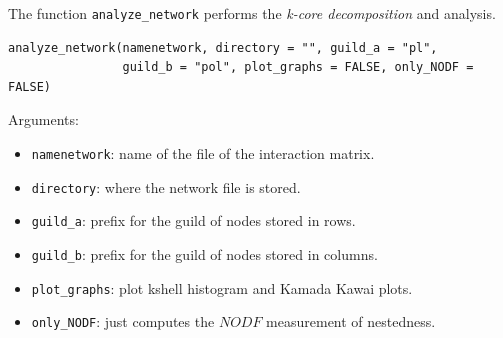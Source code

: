 \documentclass[12pt]{article}
\begin{document}
The function \texttt{analyze\_network} performs the \textit{k-core decomposition} and analysis.


\fontsize{3.5mm}{3.5mm}\selectfont
\begin{verbatim}
analyze_network(namenetwork, directory = "", guild_a = "pl",
                guild_b = "pol", plot_graphs = FALSE, only_NODF = FALSE)
\end{verbatim}
\normalsize

Arguments:
\small
\begin{itemize}

\item \texttt{namenetwork}:  name of the file of the interaction matrix.
	
\item \texttt{directory}: where the network file is stored.

\item \texttt{guild\_a}: prefix for the guild of nodes stored in rows.

\item \texttt{guild\_b}: prefix for the guild of nodes stored in columns.

\item \texttt{plot\_graphs}: plot kshell histogram and Kamada Kawai plots.

\item \texttt{only\_NODF}: just computes the $NODF$ measurement of nestedness.

\end{itemize}
\end{document}
